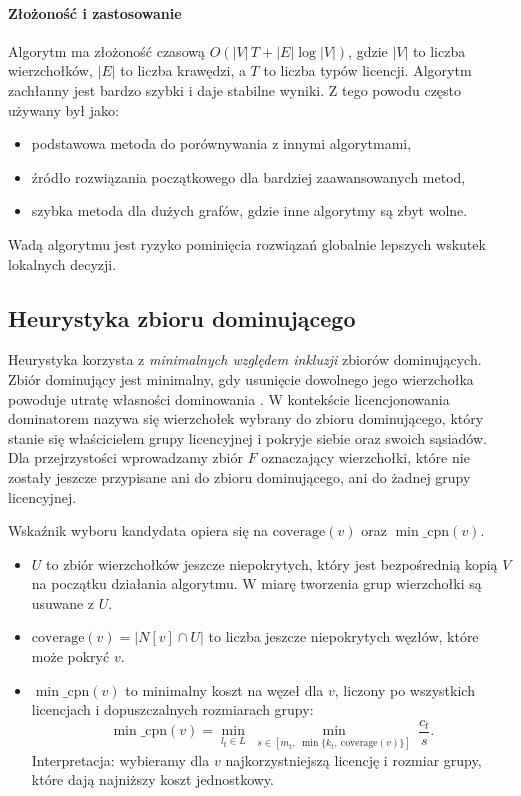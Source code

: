 \paragraph{Złożoność i zastosowanie}
Algorytm ma złożoność czasową $O(|V|\,T + |E|\log |V|)$, gdzie $|V|$ to liczba wierzchołków, $|E|$ to liczba krawędzi, a $T$ to liczba typów licencji.
Algorytm zachłanny jest bardzo szybki i daje stabilne wyniki. Z tego powodu często używany był jako:
\begin{itemize}
  \item podstawowa metoda do porównywania z innymi algorytmami,
  \item źródło rozwiązania początkowego dla bardziej zaawansowanych metod,
  \item szybka metoda dla dużych grafów, gdzie inne algorytmy są zbyt wolne.
\end{itemize}
Wadą algorytmu jest ryzyko pominięcia rozwiązań globalnie lepszych wskutek lokalnych decyzji.
\subsection{Heurystyka zbioru dominującego}\label{subsec:ds}

Heurystyka korzysta z \emph{minimalnych względem inkluzji} zbiorów dominujących. Zbiór dominujący jest minimalny, gdy usunięcie dowolnego jego wierzchołka powoduje utratę własności dominowania \cite{haynes1998domination}. W kontekście licencjonowania dominatorem nazywa się wierzchołek wybrany do zbioru dominującego, który stanie się właścicielem grupy licencyjnej i pokryje siebie oraz swoich sąsiadów. Dla przejrzystości wprowadzamy zbiór $F$ oznaczający wierzchołki, które nie zostały jeszcze przypisane ani do zbioru dominującego, ani do żadnej grupy licencyjnej.

Wskaźnik wyboru kandydata opiera się na \(\mathrm{coverage}(v)\) oraz \(\min\_\mathrm{cpn}(v)\).
\begin{itemize}
  \item $U$ to zbiór wierzchołków jeszcze niepokrytych, który jest bezpośrednią kopią $V$ na początku działania algorytmu. W miarę tworzenia grup wierzchołki są usuwane z $U$.
  \item \(\mathrm{coverage}(v)=|N[v]\cap U|\) to liczba jeszcze niepokrytych węzłów, które może pokryć \(v\).
  \item \(\min\_\mathrm{cpn}(v)\) to minimalny koszt na węzeł dla \(v\), liczony po wszystkich licencjach i dopuszczalnych rozmiarach grupy:
        \[
          \min\_\mathrm{cpn}(v)=\min_{l_t\in L}\;\min_{s\in[m_t,\;\min\{k_t,\ \mathrm{coverage}(v)\}]}\ \frac{c_t}{s}.
        \]
        Interpretacja: wybieramy dla \(v\) najkorzystniejszą licencję i rozmiar grupy, które dają najniższy koszt jednostkowy.
\end{itemize}

